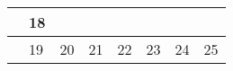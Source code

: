 {\begin{tabularx}{\linewidth}{|l!{\vrule width \myLenLineThicknessThick}*{7}{@{}X@{}|}}
       & 
    
      
      
        \begin{minipage}[t]{6mm}\centering{}18\end{minipage}
      
      
        \\  \hline 
      
    
  
  
  
  \hyperlink{week-2026-42}{} &
    
      
      
        \begin{minipage}[t]{6mm}\centering{}19\end{minipage}
      
       & 
    
      
      
        \begin{minipage}[t]{6mm}\centering{}20\end{minipage}
      
       & 
    
      
      
        \begin{minipage}[t]{6mm}\centering{}21\end{minipage}
      
       & 
    
      
      
        \begin{minipage}[t]{6mm}\centering{}22\end{minipage}
      
       & 
    
      
      
        \begin{minipage}[t]{6mm}\centering{}23\end{minipage}
      
       & 
    
      
      
        \begin{minipage}[t]{6mm}\centering{}24\end{minipage}
      
       & 
    
      
      
        \begin{minipage}[t]{6mm}\centering{}25\end{minipage}
      

\end{tabularx}}
